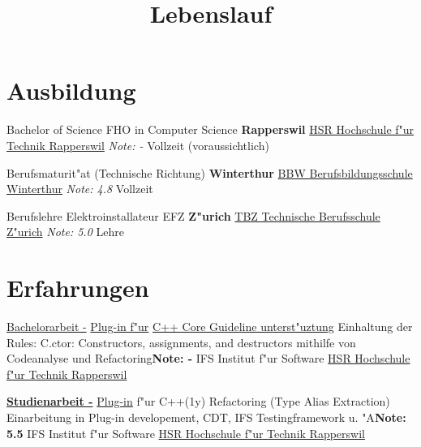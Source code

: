 \documentclass[11pt,legalpaper,sans]{moderncv}
\title{Lebenslauf}
\begin{document}
\makecvtitle

\section{Ausbildung}
{Bachelor of Science FHO in Computer Science}
{\hfill\bfseries Rapperswil}
{\newline{}\href{http://www.hsr.ch/}{HSR Hochschule f"ur Technik Rapperswil}}
{\hfill\textit{Note: -}}
{Vollzeit (voraussichtlich)}

{Berufsmaturit"at (Technische Richtung)}
{\hfill\bfseries Winterthur}
{\newline{}\href{http://www.bbw.ch/}{BBW Berufsbildungsschule Winterthur}}
{\hfill\textit{Note: 4.8}}
{Vollzeit}

{Berufslehre Elektroinstallateur EFZ}
{\hfill\bfseries Z"urich}
{\newline{}\href{htttp://www.tbz.ch/}{TBZ Technische Berufsschule Z"urich}}
{\hfill\textit{Note: 5.0}}
{Lehre}

\section{Erfahrungen}
{\href{http://sinv-56012.edu.hsr.ch/ccglator}{Bachelorarbeit -} \href{https://www.youtube.com/watch?v=CeNdN5KlPGc}{Plug-in f"ur} \href{https://github.com/isocpp/CppCoreGuidelines/blob/master/CppCoreGuidelines.md}{C++ Core Guideline unterst"uztung}}{}
{\newline{}Einhaltung der Rules: C.ctor: Constructors, assignments, and destructors mithilfe von Codeanalyse und Refactoring}{\hfill \textbf{Note: -}}
{IFS Institut f"ur Software \hfill\href{http://www.hsr.ch/}{HSR Hochschule f"ur Technik Rapperswil}}

{\href{https://eprints.hsr.ch/479/1/aliextor.pdf}{\textbf{Studienarbeit -}} \href{https://www.youtube.com/watch?v=QNrb_LbuYmI}{Plug-in} f"ur C++(1y) Refactoring (Type Alias Extraction)}{}
{\newline{}Einarbeitung in Plug-in developement, CDT, IFS Testingframework u. "A}{\hfill \textbf{Note: 5.5}}
{IFS Institut f"ur Software \hfill\href{http://www.hsr.ch/}{HSR Hochschule f"ur Technik Rapperswil}}
\end{document}
